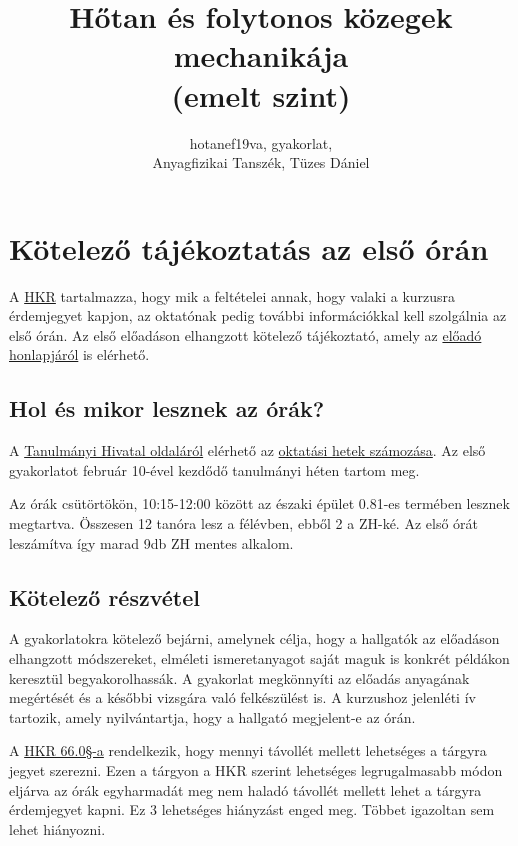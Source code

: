 \documentclass[12pt,a4paper]{scrartcl}
\begin{document}
\title{Hőtan és folytonos közegek mechanikája\\(emelt szint)}
\author{hotanef19va, gyakorlat,\\Anyagfizikai Tanszék, Tüzes Dániel}
\maketitle
\tableofcontents
\section*{Kötelező tájékoztatás az első órán}
A \href{https://www.elte.hu/file/ELTE_SZMSZ_II.pdf}{HKR} tartalmazza, hogy mik a feltételei annak, hogy valaki a kurzusra érdemjegyet kapjon, az oktatónak pedig további információkkal kell szolgálnia az első órán. Az első előadáson elhangzott kötelező tájékoztató, amely az \href{http://ispanovity.web.elte.hu/teaching/}{előadó honlapjáról} is elérhető.


\subsection{Hol és mikor lesznek az órák?}
A \href{http://to.ttk.elte.hu}{Tanulmányi Hivatal oldaláról} elérhető az \href{http://to.ttk.elte.hu/sites/default/files/201920_1_2fev_oktatasihetek_22.xls}{oktatási hetek számozása}. Az első gyakorlatot február 10-ével kezdődő tanulmányi héten tartom meg.

Az órák csütörtökön, 10:15-12:00 között az északi épület 0.81-es termében lesznek megtartva. Összesen 12 tanóra lesz a félévben, ebből 2 a ZH-ké. Az első órát leszámítva így marad 9db ZH mentes alkalom.

\subsection{Kötelező részvétel}
A gyakorlatokra kötelező bejárni, amelynek célja, hogy a hallgatók az előadáson elhangzott módszereket, elméleti ismeretanyagot saját maguk is konkrét példákon keresztül begyakorolhassák. A gyakorlat megkönnyíti az előadás anyagának megértését és a későbbi vizsgára való felkészülést is. A kurzushoz jelenléti ív tartozik, amely nyilvántartja, hogy a hallgató megjelent-e az órán.

A \href{https://www.elte.hu/file/ELTE_SZMSZ_II.pdf#page=59}{HKR 66.0§-a} rendelkezik, hogy mennyi távollét mellett lehetséges a tárgyra jegyet szerezni. Ezen a tárgyon a HKR szerint lehetséges legrugalmasabb módon eljárva az órák egyharmadát meg nem haladó távollét mellett lehet a tárgyra érdemjegyet kapni. Ez 3 lehetséges hiányzást enged meg. Többet igazoltan sem lehet hiányozni.
\end{document}
